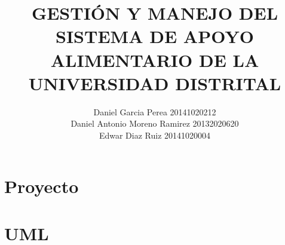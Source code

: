 \documentclass[11pt]{book}
\title{GESTIÓN Y MANEJO DEL SISTEMA DE APOYO ALIMENTARIO DE LA UNIVERSIDAD DISTRITAL}
\author{Daniel Garcia Perea 20141020212  \\ Daniel Antonio Moreno Ramirez 20132020620  \\ Edwar Diaz Ruiz 20141020004}
\begin{document}
	\maketitle
	\tableofcontents
\part{Proyecto}


\part{UML}



%
%
%



\end{document}
